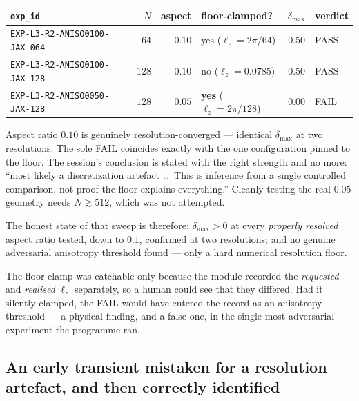 \begin{center}
\small
\begin{tabular}{@{}l r r l r l@{}}
\toprule
\texttt{exp\_id} & \(N\) & aspect & floor-clamped? & \(\delta_{\max}\) & verdict \\
\midrule
\texttt{EXP-L3-R2-ANISO0100-JAX-064} & \(64\) & \(0.10\)
  & yes (\(\ell_z=2\pi/64\)) & \(0.50\) & \textsf{PASS} \\
\texttt{EXP-L3-R2-ANISO0100-JAX-128} & \(128\) & \(0.10\)
  & no (\(\ell_z=0.0785\)) & \(0.50\) & \textsf{PASS} \\
\texttt{EXP-L3-R2-ANISO0050-JAX-128} & \(128\) & \(0.05\)
  & \textbf{yes} (\(\ell_z=2\pi/128\)) & \(\mathbf{0.00}\) & \textsf{FAIL} \\
\bottomrule
\end{tabular}
\end{center}

\medskip
Aspect ratio \(0.10\) is genuinely resolution-converged --- identical
\(\delta_{\max}\) at two resolutions. The sole \textsf{FAIL} coincides exactly
with the one configuration pinned to the floor. The session's conclusion is
stated with the right strength and no more: ``most likely a discretization
artefact \dots\ This is inference from a single controlled comparison, not
proof the floor explains everything.'' Cleanly testing the real \(0.05\)
geometry needs \(N\gtrsim512\), which was not attempted.

The honest state of that sweep is therefore: \(\delta_{\max}>0\) at every
\emph{properly resolved} aspect ratio tested, down to \(0.1\), confirmed at two
resolutions; and no genuine adversarial anisotropy threshold found --- only a
hard numerical resolution floor.

\begin{obsv}
\label{obs:floor-visible}
The floor-clamp was catchable only because the module recorded the
\emph{requested} and \emph{realised} \(\ell_z\) separately, so a human could
see that they differed. Had it silently clamped, the \textsf{FAIL} would have
entered the record as an anisotropy threshold --- a physical finding, and a
false one, in the single most adversarial experiment the programme ran.
\end{obsv}

\subsection{An early transient mistaken for a resolution artefact, and then
correctly identified}

